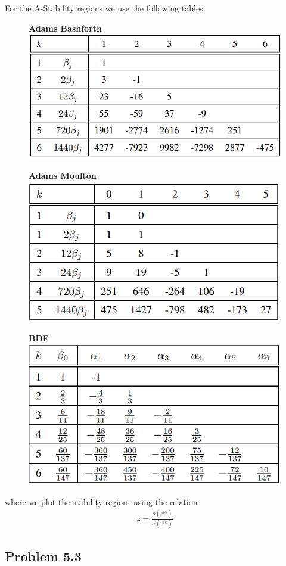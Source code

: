 \documentclass[12pt]{article}
\theoremstyle{remark}
\begin{document}
For the A-Stability regions we use the following tables

\begin{figure}[H]
	\centering
	\textbf{Adams Bashforth} \\
	\includegraphics[width=.5\textwidth]{ABTable.png}\hfill
\end{figure}

\begin{figure}[H]
	\centering
	\textbf{Adams Moulton} \\
	\includegraphics[width=.5\textwidth]{AMTable.png}
\end{figure}
	
\begin{figure}[H]
	\centering
	\textbf{BDF} \\
	\includegraphics[width=.5\textwidth]{BDFTable.png}
\end{figure}

where we plot the stability regions using the relation 
\begin{align}
	z = \frac{\rho(e^{i\phi})}{\sigma(e^{i\phi})}
\end{align}

\newpage

\subsection{Problem 5.3}
\end{document}
